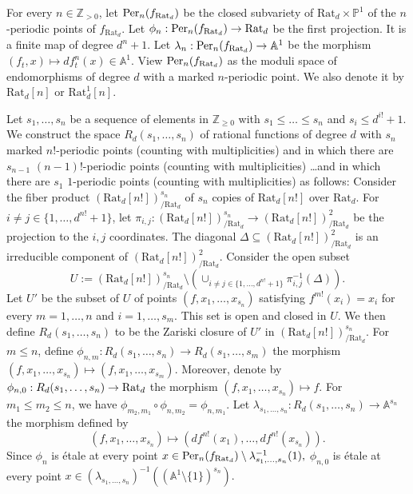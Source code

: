 \documentclass[12pt]{amsart}
\theoremstyle{plain}
\theoremstyle{remark}
\theoremstyle{definition}
\def\A{\mathbb A}
\def\Z{\mathbb Z}
\def\P{\mathbb P}
\def\Per{{\rm Per}}
\def\la{\lambda}
\begin{document}
For every $n\in\Z_{>0}$, let $\Per_n(f_{\text{Rat}_d})$ be the closed subvariety of $\text{Rat}_d\times \P^1$ of the $n$-periodic points of $f_{\text{Rat}_d}.$ 
Let $\phi_n: \Per_n(f_{\text{Rat}_d})\to \text{Rat}_d$ be the first projection. It is a finite map of degree $d^n+1.$
Let $\la_n: \Per_n(f_{\text{Rat}_d})\to \A^1$ be the morphism $(f_t, x)\mapsto df_t^n(x)\in \A^1$. 
View $\Per_n(f_{\text{Rat}_d})$ as the moduli space of endomorphisms of degree $d$ with a marked $n$-periodic point.
We also denote  it by $\text{Rat}_d[n]$ or $\text{Rat}^1_d[n]$.


Let $s_1,\dots, s_n$ be a sequence of elements in $\Z_{\geq 0}$ with $s_1\leq \dots \leq s_n$ and $s_i\leq d^{i!}+1.$
We construct the space $R_d(s_1,\dots, s_n)$ of rational functions of degree $d$ with $s_n$ marked $n!$-periodic points (counting with multiplicities) and in which there are $s_{n-1}$ $(n-1)!$-periodic points (counting with multiplicities) \dots and in which there are $s_{1}$ $1$-periodic points (counting with multiplicities) as follows:
Consider the fiber product $(\text{Rat}_d[n!])^{s_n}_{/\text{Rat}_d}$ of $s_n$ copies of $\text{Rat}_d[n!]$ over 
$\text{Rat}_d.$ For $i\neq j\in \{1,\dots, d^{n!}+1\}$, let 
$\pi_{i,j}: (\text{Rat}_d[n!])^{s_n}_{/\text{Rat}_d}\to (\text{Rat}_d[n!])^2_{/\text{Rat}_d}$ be the projection to the $i,j$ coordinates. 
The diagonal $\Delta\subseteq (\text{Rat}_d[n!])^2_{/\text{Rat}_d}$ is an irreducible component of $(\text{Rat}_d[n!])^2_{/\text{Rat}_d}$.
Consider the open subset $$U:=(\text{Rat}_d[n!])^{s_n}_{/\text{Rat}_d}\setminus (\cup_{i\neq j\in \{1,\dots, d^{n!}+1\}}\pi_{i,j}^{-1}(\Delta)).$$
Let $U'$ be the subset of $U$ of points $(f, x_1,\dots, x_{s_n})$ satisfying $f^{m!}(x_i)=x_i$ for every $m=1,\dots, n$ and $i=1,\dots, s_m$.
This set is open and closed in $U.$ We then define $R_d(s_1,\dots, s_n)$ to be the Zariski closure of $U'$ in $(\text{Rat}_d[n!])^{s_n}_{/\text{Rat}_d}.$
For $m\leq n$, define $\phi_{n,m}: R_d(s_1,\dots, s_n)\to R_d(s_1,\dots, s_m)$ the morphism $(f, x_1,\dots, x_{s_n})\mapsto (f, x_1,\dots, x_{s_m}).$
Moreover, denote by $\phi_{n,0}: R_d(s_1,\dots, s_n)\to {\rm Rat}_d$ the morphism $(f, x_1,\dots, x_{s_n})\mapsto f.$
For $m_1\leq m_2\leq n$,  we have $\phi_{m_2,m_1}\circ\phi_{n,m_2}=\phi_{n,m_1}.$
Let $\la_{s_1,\dots,s_n}: R_d(s_1,\dots, s_n)\to \A^{s_n}$ the morphism
defined by $$(f, x_1,\dots,x_{s_n})\mapsto (df^{n!}(x_1),\dots, df^{n!}(x_{s_n})).$$ 
Since $\phi_n$ is \'etale at every point $x\in \Per_n(f_{\text{Rat}_d})\setminus \la_{s_1,\dots,s_n}^{-1}(1),$
$\phi_{n,0}$ is \'etale at every point $x\in (\la_{s_1,\dots,s_n})^{-1}((\A^1\setminus \{1\})^{s_n}).$ 
\end{document}
